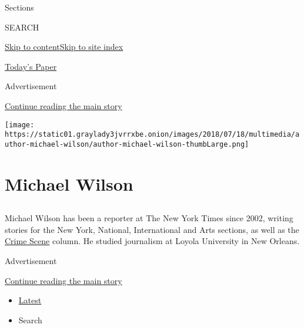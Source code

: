 Sections

SEARCH

\protect\hyperlink{site-content}{Skip to
content}\protect\hyperlink{site-index}{Skip to site index}

\href{https://myaccount.nytimes3xbfgragh.onion/auth/login?response_type=cookie\&client_id=vi}{}

\href{https://www.nytimes3xbfgragh.onion/section/todayspaper}{Today's
Paper}

Advertisement

\protect\hyperlink{after-top}{Continue reading the main story}

\texttt{[image: https://static01.graylady3jvrrxbe.onion/images/2018/07/18/multimedia/author-michael-wilson/author-michael-wilson-thumbLarge.png]}

\hypertarget{michael-wilson}{%
\section{Michael Wilson}\label{michael-wilson}}

\subsection{}

Michael Wilson has been a reporter at The New York Times since 2002,
writing stories for the New York, National, International and Arts
sections, as well as the
\href{https://www.nytimes3xbfgragh.onion/column/crime-scene}{Crime
Scene} column. He studied journalism at Loyola University in New
Orleans.

Advertisement

\protect\hyperlink{after-mid1}{Continue reading the main story}

\begin{itemize}
\tightlist
\item
  \protect\hyperlink{stream-panel}{Latest}
\item
  Search
\end{itemize}

